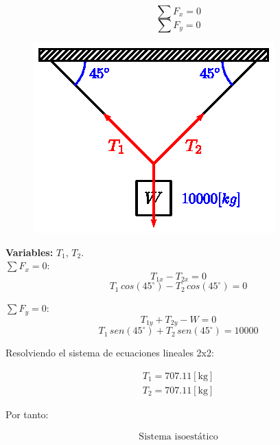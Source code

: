 \documentclass[letter,10pt,twoside]{article}
\begin{document}
\begin{equation*}
    \sum{F_x} = 0
\end{equation*}
\begin{equation*}
    \sum{F_y} = 0
\end{equation*}

\begin{figure}[H]
\centering
\includegraphics[scale=1.3]{resources/g01.eps}
\end{figure}

\textbf{Variables:} $T_1$, $T_2$.
\\

$\sum{F_x} = 0$:
\begin{equation*}
    T_{1x} - T_{2x} = 0
\end{equation*}
\begin{equation*}
    T_1\,cos(45^\circ) - T_2\,cos(45^\circ) = 0
\end{equation*}

$\sum{F_y} = 0$:
\begin{equation*}
    T_{1y} + T_{2y} - W = 0
\end{equation*}
\begin{equation*}
    T_1\,sen(45^\circ) + T_2\,sen(45^\circ) = 10000
\end{equation*}

Resolviendo el sistema de ecuaciones lineales 2x2:

\begin{equation*}
\boxed{
    \begin{array}{l}
        T_1 = 707.11[\text{kg}] \\
        T_2 = 707.11[\text{kg}]
    \end{array}
}
\end{equation*}

Por tanto:

\begin{equation*}
\boxed{
    \begin{array}{l}
        \text{Sistema isoestático}
    \end{array}
}
\end{equation*}
\end{document}
